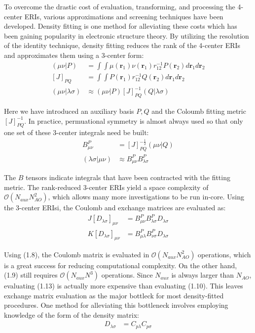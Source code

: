 To overcome the drastic cost of evaluation, transforming, and processing the 4-center ERIs, various approximations 
and screening techniques have been developed.  
Density fitting is one method for alleviating these costs which has been gaining popularity in electronic structure theory.
By utilizing the resolution of the identity technique, 
density fitting reduces the rank of the 4-center ERIs and approximates them using a 3-center form: 
\begin{align} 
(\mu \nu|P) &= \int \int \mu(\textbf{r}_{1}) 
\nu(\textbf{r}_{1}) r^{-1}_{12} P(\textbf{r}_{2}) d\textbf{r}_{1} d\textbf{r}_{2} \\
[J]_{PQ} &= \int \int P(\textbf{r}_1)r_{12}^{-1}Q(\textbf{r}_2) d{\textbf{r}_{1}}d{\textbf{r}_{2}} \\
(\mu \nu|\lambda \sigma) &\approx (\mu \nu| P)[J]_{PQ}^{-1}(Q|\lambda \sigma)  
\end{align} 

\noindent Here we have introduced an auxiliary basis $P, Q$ and the Coloumb fitting metric $[J]_{PQ}^{-1}$. 
In practice, permuational symmetry is almost always used so that only one set of these 3-center integrals need be built:
\begin{align} 
B_{\mu \nu}^P &= [J]_{PQ}^{-\frac{1}{2}}(\mu \nu | Q)  \\ 
(\lambda \sigma | \mu \nu) &\approx  B_{\mu \nu}^P B_{\lambda \sigma}^P  \end{align} 

\noindent The $B$ tensors indicate integrals that have been contracted with the fitting metric.
The rank-reduced 3-center ERIs yield a space complexity of $\mathcal{O}(N_{aux}N_{AO}^2)$, 
which allows many more investigations to be run in-core.  
Using the 3-center ERIsi, the Coulomb and exchange matrices are evaluated as: 
\begin{align}
J[D_{\lambda \sigma}]_{\mu \nu} &= B_{\mu \nu}^P B_{\lambda \sigma}^PD_{\lambda \sigma} \\
K[D_{\lambda \sigma}]_{\mu \nu} &= B_{\mu \lambda}^P B_{\nu \sigma}^PD_{\lambda \sigma}
\end{align}

\noindent Using (1.8), the Coulomb matrix is evaluated in $\mathcal{O}(N_{aux}N_{AO}^2)$ operations, which is a great success
for reducing computational complexity. On the other hand, (1.9) still requires $\mathcal{O}(N_{aux}N^3)$ operations. 
Since $N_{aux}$ is always larger than $N_{AO}$, evaluating (1.13) is actually more expensive than evaluating (1.10).
This leaves exchange matrix evaluation as the major bottleck for most density-fitted procedures.
One method for alleviating this bottleneck involves employing knowledge 
of the form of the density matrix:
\begin{align}
D_{\lambda \sigma} &= C_{p\lambda}C_{p\sigma} 
\end{align}

